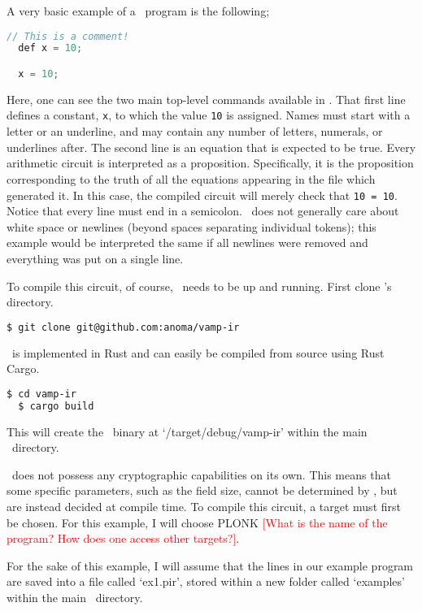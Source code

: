 A very basic example of a \vampir\ program is the following;

\begin{lstlisting}[language=c]
  // This is a comment!
  def x = 10;

  x = 10;
\end{lstlisting}

Here, one can see the two main top-level commands available in \vampir. That first line defines a constant, \lstinline{x}, to which the value \lstinline{10} is assigned. Names must start with a letter or an underline, and may contain any number of letters, numerals, or underlines after. The second line is an equation that is expected to be true. Every arithmetic circuit is interpreted as a proposition. Specifically, it is the proposition corresponding to the truth of all the equations appearing in the file which generated it. In this case, the compiled circuit will merely check that \lstinline{10 = 10}. Notice that every line must end in a semicolon. \vampir\ does not generally care about white space or newlines (beyond spaces separating individual tokens); this example would be interpreted the same if all newlines were removed and everything was put on a single line.

To compile this circuit, of course, \vampir\ needs to be up and running. First clone \vampir's directory.

\begin{lstlisting}[language=bash]
  $ git clone git@github.com:anoma/vamp-ir
\end{lstlisting}

\vampir\ is implemented in Rust and can easily be compiled from source using Rust Cargo.

\begin{lstlisting}[language=bash]
  $ cd vamp-ir
  $ cargo build
\end{lstlisting}

This will create the \vampir\ binary at `/target/debug/vamp-ir' within the main \vampir\ directory.

\vampir\ does not possess any cryptographic capabilities on its own. This means that some specific parameters, such as the field size, cannot be determined by \vampir, but are instead decided at compile time. To compile this circuit, a target must first be chosen. For this example, I will choose PLONK \textcolor{red}{[What is the name of the program? How does one access other targets?]}.

For the sake of this example, I will assume that the lines in our example program are saved into a file called `ex1.pir', stored within a new folder called `examples' within the main \vampir\ directory. 

